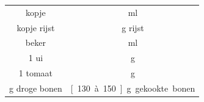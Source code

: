\begin{tabular}{|c|c|}
    \hline
    \unit[1]{kopje} & \unit[125]{ml} \\
    \unit[1]{kopje} rijst & \unit[100]{g} rijst \\ 
    \unit[1]{beker} & \unit[180]{ml} \\
    1 ui &  \unit[75]{g} \\
    1 tomaat & \unit[70]{g} \\
    \unit[100]{g} droge bonen & \unit[130 \`{a} 150]{g} gekookte bonen \\
    \hline
\end{tabular}